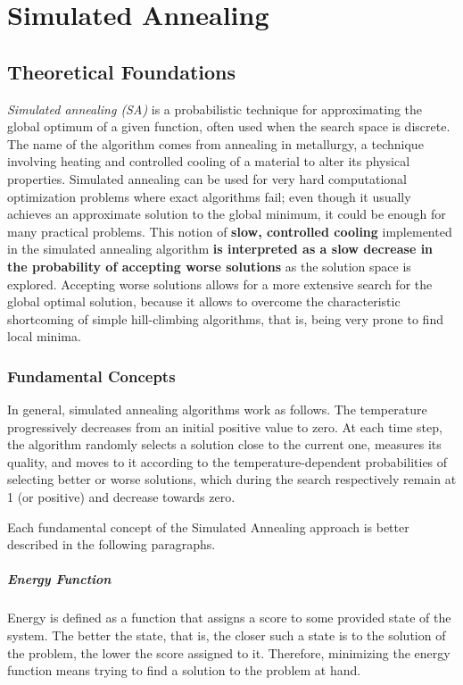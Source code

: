 \chapter{Simulated Annealing}

\section{Theoretical Foundations}

\textit{Simulated annealing (SA)} is a probabilistic technique for approximating the global optimum of a given function, often used when the search space is discrete.
The name of the algorithm comes from annealing in metallurgy, a technique involving heating and controlled cooling of a material to alter its physical properties.
Simulated annealing can be used for very hard computational optimization problems where exact algorithms fail; even though it usually achieves an approximate solution to the global minimum, it could be enough for many practical problems.
This notion of \textbf{slow, controlled cooling} implemented in the simulated annealing algorithm \textbf{is interpreted as a slow decrease in the probability of accepting worse solutions} as the solution space is explored. Accepting worse solutions allows for a more extensive search for the global optimal solution, because it allows to overcome the characteristic shortcoming of simple hill-climbing algorithms, that is, being very prone to find local minima.

\subsection{Fundamental Concepts}\label{ann_fund_concepts}

In general, simulated annealing algorithms work as follows. The temperature progressively decreases from an initial positive value to zero. At each time step, the algorithm randomly selects a solution close to the current one, measures its quality, and moves to it according to the temperature-dependent probabilities of selecting better or worse solutions, which during the search respectively remain at 1 (or positive) and decrease towards zero.
\par
Each fundamental concept of the Simulated Annealing approach is better described in the following paragraphs.

\paragraph{Energy Function} Energy is defined as a function that assigns a score to some provided state of the system. The better the state, that is, the closer such a state is to the solution of the problem, the lower the score assigned to it. Therefore, minimizing the energy function means trying to find a solution to the problem at hand. 

